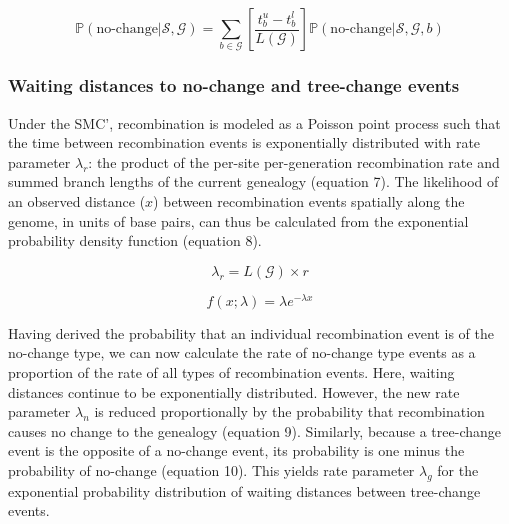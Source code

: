\documentclass[11pt]{article}
\begin{document}
\begin{equation}
	\mathbb{P}(\text{no-change} | \mathcal{S},\mathcal{G}) = 
	\sum_{b \in \mathcal{G}}
	\left[\frac{t^u_b - t^l_b}{L(\mathcal{G})}\right]
	\mathbb{P}(\text{no-change} | \mathcal{S},\mathcal{G},b)
\end{equation}


\subsubsection{Waiting distances to no-change and tree-change events}
Under the SMC', recombination is modeled as a Poisson point process 
such that the time between recombination events is exponentially distributed 
with rate parameter $\lambda_r$: the product of the per-site
per-generation recombination rate and summed branch lengths of
the current genealogy \citep{wiuf_recombination_1999} (equation 7).
The likelihood of an observed distance ($x$) between recombination
events spatially along the genome, in units of base pairs, can thus 
be calculated from the exponential probability density function 
(equation 8).


\begin{equation}
	\lambda_{r} = L(\mathcal{G}) \times r
\end{equation}


\begin{equation}
	f(x; \lambda) = \lambda e^{-\lambda x}
\end{equation}

\noindent Having derived the probability that an individual recombination event 
is of the no-change type, we can now calculate 
the rate of no-change type events as a proportion of the rate of all types of 
recombination events. 
Here, waiting distances continue to be exponentially distributed. 
However, the new rate parameter $\lambda_n$ is reduced proportionally by 
the probability that recombination causes no change to the genealogy
(equation 9). Similarly, because a tree-change event is the opposite 
of a no-change event, its probability is one minus the probability
of no-change (equation 10). This yields rate parameter $\lambda_g$ for 
the exponential probability distribution of waiting distances between 
tree-change events.
\end{document}
